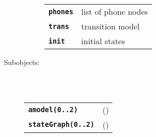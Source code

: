 \begin{description}
\begin{description}
      \begin{tabular}{ll}
 \texttt{\textbf{phones}} &  list of phone nodes \\
 \texttt{\textbf{trans}} &    transition model  \\
 \texttt{\textbf{init}} &     initial states \\
      \end{tabular}
    \end{description}

  \item[Subobjects:] \hfill \\
\ 
    \begin{tabular}{ll}
      \texttt{\textbf{amodel(0..2)}} & (\Jref{module}{???}) \\
      \texttt{\textbf{stateGraph(0..2)}} & (\Jref{module}{???}) \\
    \end{tabular}
\vspace{3mm}

\end{description}

